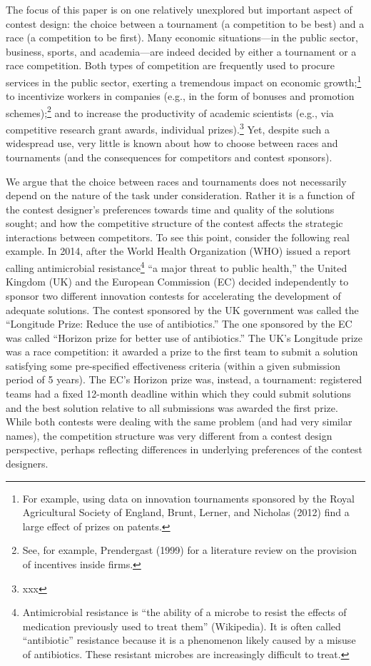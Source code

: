 \documentclass[11pt, titlepage]{article}
\begin{document}
The focus of this paper is on one relatively unexplored but important
aspect of contest design: the choice between a tournament (a competition
to be best) and a race (a competition to be first). Many economic
situations---in the public sector, business, sports, and academia---are
indeed decided by either a tournament or a race competition. Both types
of competition are frequently used to procure services in the public
sector, exerting a tremendous impact on economic growth;\footnote{For
  example, using data on innovation tournaments sponsored by the Royal
  Agricultural Society of England, Brunt, Lerner, and Nicholas (2012)
  find a large effect of prizes on patents.} to incentivize workers in
companies (e.g., in the form of bonuses and promotion
schemes);\footnote{See, for example, Prendergast (1999) for a literature
  review on the provision of incentives inside firms.} and to increase
the productivity of academic scientists (e.g., via competitive research
grant awards, individual prizes).\footnote{xxx} Yet, despite such a
widespread use, very little is known about how to choose between races
and tournaments (and the consequences for competitors and contest
sponsors).

We argue that the choice between races and tournaments does not
necessarily depend on the nature of the task under consideration. Rather
it is a function of the contest designer's preferences towards time and
quality of the solutions sought; and how the competitive structure of
the contest affects the strategic interactions between competitors. To
see this point, consider the following real example. In 2014, after the
World Health Organization (WHO) issued a report calling antimicrobial
resistance\footnote{Antimicrobial resistance is ``the ability of a
  microbe to resist the effects of medication previously used to treat
  them'' (Wikipedia). It is often called ``antibiotic'' resistance
  because it is a phenomenon likely caused by a misuse of antibiotics.
  These resistant microbes are increasingly difficult to treat.} ``a
major threat to public health,'' the United Kingdom (UK) and the
European Commission (EC) decided independently to sponsor two different
innovation contests for accelerating the development of adequate
solutions. The contest sponsored by the UK government was called the
``Longitude Prize: Reduce the use of antibiotics.'' The one sponsored by
the EC was called ``Horizon prize for better use of antibiotics.'' The
UK's Longitude prize was a race competition: it awarded a prize to the
first team to submit a solution satisfying some pre-specified
effectiveness criteria (within a given submission period of 5 years).
The EC's Horizon prize was, instead, a tournament: registered teams had
a fixed 12-month deadline within which they could submit solutions and
the best solution relative to all submissions was awarded the first
prize. While both contests were dealing with the same problem (and had
very similar names), the competition structure was very different from a
contest design perspective, perhaps reflecting differences in underlying
preferences of the contest designers.
\end{document}
